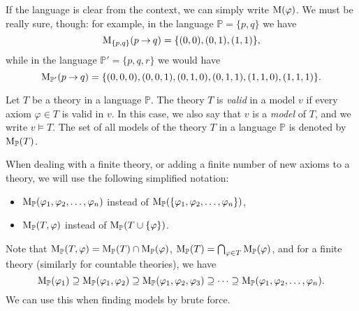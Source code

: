 If the language is clear from the context, we can simply write $\operatorname{M}(\varphi)$. We must be really sure, though: for example, in the language $\mathbb{P} = \{p,q\}$ we have 
$$
\operatorname{M}_{\{p,q\}}(p \mathbin{\rightarrow} q) = \{(0,0),(0,1),(1,1)\},
$$
while in the language $\mathbb{P}' = \{p,q,r\}$ we would have
$$
\operatorname{M}_{\mathbb{P}'}(p \mathbin{\rightarrow} q) = \{(0,0,0),(0,0,1),(0,1,0),(0,1,1),(1,1,0),(1,1,1)\}.
$$

\begin{definition}\label{definition:validity-of-theory}
    Let $T$ be a theory in a language $\mathbb P$. The theory $T$ is \emph{valid} in a model $v$ if every axiom $\varphi \in T$ is valid in $v$. In this case, we also say that $v$ is a \emph{model} of $T$, and we write $v \models T$. The set of all models of the theory $T$ in a language $\mathbb P$ is denoted by $\operatorname{M}_\mathbb P(T)$.    
\end{definition}

When dealing with a finite theory, or adding a finite number of new axioms to a theory, we will use the following simplified notation:
\begin{itemize}
    \item $\operatorname{M}_\mathbb{P}(\varphi_1, \varphi_2, \dots, \varphi_n)$ instead of $\operatorname{M}_\mathbb{P}(\{\varphi_1, \varphi_2, \dots, \varphi_n\})$,
    \item $\operatorname{M}_\mathbb{P}(T, \varphi)$ instead of $\operatorname{M}_\mathbb{P}(T \cup \{\varphi\})$.
\end{itemize}

Note that $\operatorname{M}_\mathbb{P}(T, \varphi) = \operatorname{M}_\mathbb{P}(T) \cap \operatorname{M}_\mathbb{P}(\varphi)$, $\operatorname{M}_\mathbb{P}(T) = \bigcap_{\varphi \in T} \operatorname{M}_\mathbb{P}(\varphi)$, and for a finite theory (similarly for countable theories), we have
$$
\operatorname{M}_\mathbb P(\varphi_1)\supseteq \operatorname{M}_\mathbb P(\varphi_1,\varphi_2)\supseteq \operatorname{M}_\mathbb P(\varphi_1,\varphi_2,\varphi_3)\supseteq\dots\supseteq\operatorname{M}_\mathbb P(\varphi_1,\varphi_2,\dots,\varphi_n).
$$
We can use this when finding models by brute force.

